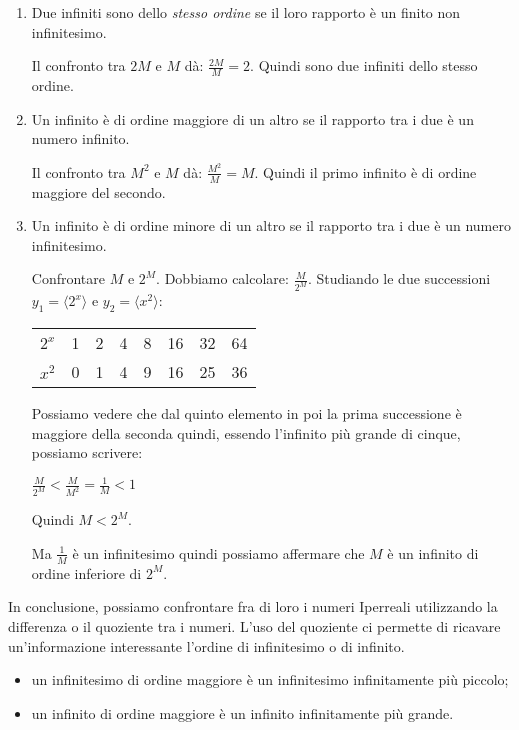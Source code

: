 \begin{enumerate}
 \item Due infiniti sono dello \emph{stesso ordine} se il loro rapporto è un 
finito non infinitesimo.
\begin{esempio}
 Il confronto tra $2M$ e $M$ dà: $\frac{2M}{M} = 2$. Quindi sono due infiniti 
dello stesso ordine.
\end{esempio}
 \item Un infinito è di ordine maggiore di un altro se il rapporto tra i due è 
un numero infinito.
\begin{esempio}
 Il confronto tra $M^2$ e $M$ dà: $\frac{M^2}{M} = M$. Quindi il primo infinito 
è di ordine maggiore del secondo.
\end{esempio}
 \item Un infinito è di ordine minore di un altro se il rapporto tra i due è 
un numero infinitesimo.
\begin{esempio}
 Confrontare $M$ e $2^M$. Dobbiamo calcolare: $\frac{M}{2^M}$. 
Studiando le due successioni 
$y_1=\langle 2^x \rangle$ e $y_2=\langle x^2 \rangle$:
\begin{center}
\begin{tabular}{cccccccc}
$2^x$ & 1 & 2 & 4 & 8 & 16 & 32 & 64\\
$x^2$ & 0 & 1 & 4 & 9 & 16 & 25 & 36
\end{tabular}
\end{center}
Possiamo vedere che dal quinto elemento in poi la prima successione è maggiore 
della seconda quindi, essendo l'infinito più grande di cinque, possiamo 
scrivere:

$\frac{M}{2^M} < \frac{M}{M^2} = \frac{1}{M} < 1$

Quindi $M < 2^M$.

Ma $\frac{1}{M}$ è un infinitesimo quindi possiamo affermare che $M$ è un 
infinito di ordine inferiore di $2^M$.
\end{esempio}
\end{enumerate}

In conclusione, possiamo confrontare fra di loro i numeri Iperreali utilizzando 
la differenza o il quoziente tra i numeri. L'uso del quoziente ci permette di 
ricavare un'informazione interessante l'ordine di infinitesimo o di infinito.
\begin{itemize} [noitemsep]
 \item un infinitesimo di ordine maggiore è un infinitesimo infinitamente più 
piccolo;
 \item un infinito di ordine maggiore è un infinito infinitamente più 
grande.
\end{itemize}

